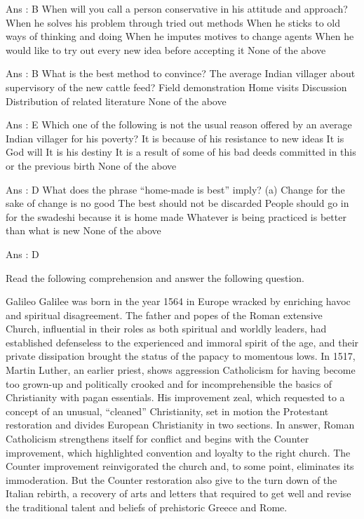         Ans : B
        When will you call a person conservative in his attitude and approach?
            When he solves his problem through tried out methods
            When he sticks to old ways of thinking and doing
            When he imputes motives to change agents
            When he would like to try out every new idea before accepting it
            None of the above 

        Ans : B
        What is the best method to convince? The average Indian villager about supervisory of the new cattle feed?
            Field demonstration
            Home visits
            Discussion
            Distribution of related literature
            None of the above 

        Ans : E
        Which one of the following is not the usual reason offered by an average Indian villager for his poverty?
            It is because of his resistance to new ideas
            It is God will
            It is his destiny
            It is a result of some of his bad deeds committed in this or the previous birth
            None of the above 

        Ans : D
        What does the phrase “home-made is best” imply?
            (a) Change for the sake of change is no good
            The best should not be discarded
            People should go in for the swadeshi because it is home made
            Whatever is being practiced is better than what is new
            None of the above 

        Ans : D 


Read the following comprehension and answer the following question.

    Galileo Galilee was born in the year 1564 in Europe wracked by enriching havoc and spiritual disagreement. The father and popes of the Roman extensive Church, influential in their roles as both spiritual and worldly leaders, had established defenseless to the experienced and immoral spirit of the age, and their private dissipation brought the status of the papacy to momentous lows. In 1517, Martin Luther, an earlier priest, shows aggression Catholicism for having become too grown-up and politically crooked and for incomprehensible the basics of Christianity with pagan essentials. His improvement zeal, which requested to a concept of an unusual, “cleaned” Christianity, set in motion the Protestant restoration and divides European Christianity in two sections. In answer, Roman Catholicism strengthens itself for conflict and begins with the Counter improvement, which highlighted convention and loyalty to the right church. The Counter improvement reinvigorated the church and, to some point, eliminates its immoderation. But the Counter restoration also give to the turn down of the Italian rebirth, a recovery of arts and letters that required to get well and revise the traditional talent and beliefs of prehistoric Greece and Rome.

